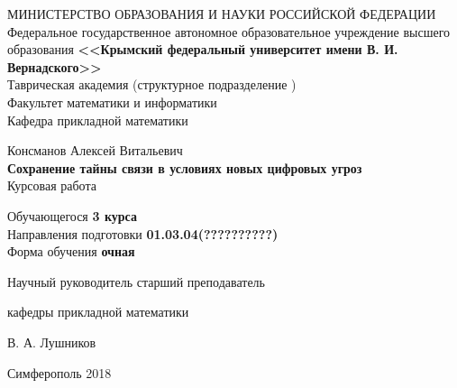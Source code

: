     \begin{titlepage}
    \newpage
	\pagestyle{empty} %
    \begin{center}
    \normalsize МИНИСТЕРСТВО ОБРАЗОВАНИЯ И НАУКИ РОССИЙСКОЙ ФЕДЕРАЦИИ\\ 
    \small  {Федеральное государственное автономное образовательное учреждение высшего образования} 
    \large \textbf{<<Крымский  федеральный  университет имени В. И. Вернадского>>} \\  \vspace{2mm}
    Таврическая академия (структурное подразделение ) \\
    \vspace{2mm}
    Факультет математики и информатики \\
    \vspace{2mm}
    Кафедра прикладной математики 
    \end{center}
    \vspace{3em}

    \begin{center}
	\normalsize Консманов Алексей Витальевич \\
    \LARGE \textbf{Сохранение тайны связи в условиях новых цифровых угроз} \\
    \vspace{1em}
    \normalsize Курсовая работа 
    \end{center}

    \vspace{1em}
    
    \begin{center}
    	\begin{tabbing}	%
    		\hspace{3cm}Обучающегося \hspace{3cm} \textbf{3 курса}\\ %
    		\hspace{3cm}Направления подготовки \hspace{7mm}  \textbf{01.03.04(??????????)}\\
    		\hspace{3cm}Форма обучения \hspace{26mm} \textbf{очная}
    	\end{tabbing}
    
	\vspace {3em}
    \flushleft Научный руководитель \hspace{20mm}  старший преподаватель 
    
    \hspace{75mm}кафедры прикладной математики  
    
    
    \hspace{75mm}В. А. Лушников
	\end{center}
    \vspace{\fill}

    \begin{center}
    Симферополь 2018
    \end{center}

    \end{titlepage}